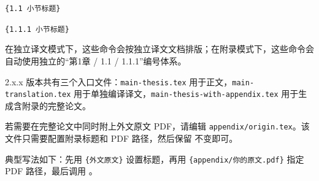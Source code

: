 \texttt{\string\translationsubsection\{1.1 小节标题\}}

\texttt{\string\translationsubsubsection\{1.1.1 小节标题\}}

在独立译文模式下，这些命令会按独立译文文档排版；在附录模式下，这些命令会自动使用独立的“第1章 / 1.1 / 1.1.1”编号体系。

2.x.x 版本共有三个入口文件：\texttt{main-thesis.tex} 用于正文，\texttt{main-translation.tex} 用于单独编译译文，\texttt{main-thesis-with-appendix.tex} 用于生成含附录的完整论文。

若需要在完整论文中同时附上外文原文 PDF，请编辑 \texttt{appendix/origin.tex}。该文件只需要配置附录标题和 PDF 路径，然后保留 \texttt{\string\USTSIncludeOriginAppendix} 不变即可。

典型写法如下：先用 \texttt{\string\setoriginappendixtitle\{外文原文\}} 设置标题，再用 \texttt{\string\setoriginpdfpath\{appendix/你的原文.pdf\}} 指定 PDF 路径，最后调用 \texttt{\string\USTSIncludeOriginAppendix}。

